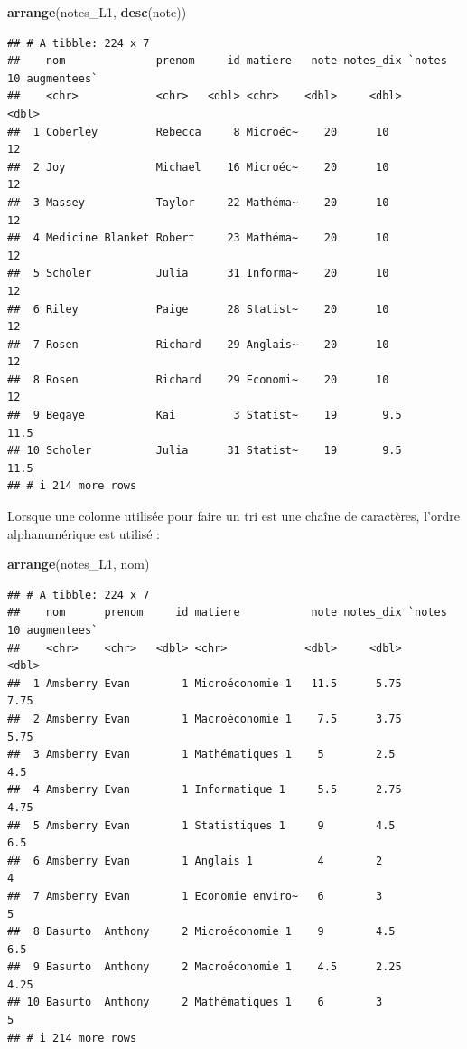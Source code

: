 \documentclass[
  11pt,
]{book}
\newenvironment{Shaded}{\begin{snugshade}}{\end{snugshade}}
\newcommand{\FunctionTok}[1]{\textcolor[rgb]{0.13,0.29,0.53}{\textbf{#1}}}
\newcommand{\NormalTok}[1]{#1}
\numberwithin{equation}{section}
\numberwithin{countremarque}{section}
\begin{document}
\begin{Shaded}
\begin{Highlighting}[]
\FunctionTok{arrange}\NormalTok{(notes\_L1, }\FunctionTok{desc}\NormalTok{(note))}
\end{Highlighting}
\end{Shaded}

\begin{lstlisting}
## # A tibble: 224 x 7
##    nom              prenom     id matiere   note notes_dix `notes 10 augmentees`
##    <chr>            <chr>   <dbl> <chr>    <dbl>     <dbl>                 <dbl>
##  1 Coberley         Rebecca     8 Microéc~    20      10                    12  
##  2 Joy              Michael    16 Microéc~    20      10                    12  
##  3 Massey           Taylor     22 Mathéma~    20      10                    12  
##  4 Medicine Blanket Robert     23 Mathéma~    20      10                    12  
##  5 Scholer          Julia      31 Informa~    20      10                    12  
##  6 Riley            Paige      28 Statist~    20      10                    12  
##  7 Rosen            Richard    29 Anglais~    20      10                    12  
##  8 Rosen            Richard    29 Economi~    20      10                    12  
##  9 Begaye           Kai         3 Statist~    19       9.5                  11.5
## 10 Scholer          Julia      31 Statist~    19       9.5                  11.5
## # i 214 more rows
\end{lstlisting}

Lorsque une colonne utilisée pour faire un tri est une chaîne de caractères, l'ordre alphanumérique est utilisé :

\begin{Shaded}
\begin{Highlighting}[]
\FunctionTok{arrange}\NormalTok{(notes\_L1, nom)}
\end{Highlighting}
\end{Shaded}

\begin{lstlisting}
## # A tibble: 224 x 7
##    nom      prenom     id matiere           note notes_dix `notes 10 augmentees`
##    <chr>    <chr>   <dbl> <chr>            <dbl>     <dbl>                 <dbl>
##  1 Amsberry Evan        1 Microéconomie 1   11.5      5.75                  7.75
##  2 Amsberry Evan        1 Macroéconomie 1    7.5      3.75                  5.75
##  3 Amsberry Evan        1 Mathématiques 1    5        2.5                   4.5 
##  4 Amsberry Evan        1 Informatique 1     5.5      2.75                  4.75
##  5 Amsberry Evan        1 Statistiques 1     9        4.5                   6.5 
##  6 Amsberry Evan        1 Anglais 1          4        2                     4   
##  7 Amsberry Evan        1 Economie enviro~   6        3                     5   
##  8 Basurto  Anthony     2 Microéconomie 1    9        4.5                   6.5 
##  9 Basurto  Anthony     2 Macroéconomie 1    4.5      2.25                  4.25
## 10 Basurto  Anthony     2 Mathématiques 1    6        3                     5   
## # i 214 more rows
\end{lstlisting}
\end{document}
